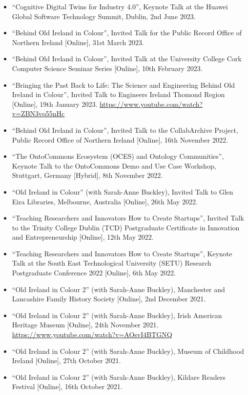 \documentclass[10pt,a4paper]{res} %
\begin{document}
\begin{resume}
\begin{itemize} \itemsep -2pt
\item ``Cognitive Digital Twins for Industry 4.0'', Keynote Talk at the Huawei Global Software Technology Summit, Dublin, 2nd June 2023.
\item ``Behind Old Ireland in Colour'', Invited Talk for the Public Record Office of Northern Ireland [Online], 31st March 2023.
\item ``Behind Old Ireland in Colour'', Invited Talk at the University College Cork Computer Science Seminar Series [Online], 10th February 2023.
\item ``Bringing the Past Back to Life: The Science and Engineering Behind Old Ireland in Colour'', Invited Talk to Engineers Ireland Thomond Region [Online], 19th January 2023. \url{https://www.youtube.com/watch?v=ZBN3vq55nHc}
\item ``Behind Old Ireland in Colour'', Invited Talk to the CollabArchive Project, Public Record Office of Northern Ireland [Online], 16th November 2022.
\item ``The OntoCommons Ecosystem (OCES) and Ontology Communities'', Keynote Talk to the OntoCommons Demo and Use Case Workshop, Stuttgart, Germany [Hybrid], 8th November 2022.
\item ``Old Ireland in Colour'' (with Sarah-Anne Buckley), Invited Talk to Glen Eira Libraries, Melbourne, Australia [Online], 26th May 2022.
\item ``Teaching Researchers and Innovators How to Create Startups'', Invited Talk to the Trinity College Dublin (TCD) Postgraduate Certificate in Innovation and Entrepreneurship [Online], 12th May 2022.
\item ``Teaching Researchers and Innovators How to Create Startups'', Keynote Talk at the South East Technological University (SETU) Research Postgraduate Conference 2022 [Online], 6th May 2022.
\item ``Old Ireland in Colour 2'' (with Sarah-Anne Buckley), Manchester and Lancashire Family History Society [Online], 2nd December 2021.
\item ``Old Ireland in Colour 2'' (with Sarah-Anne Buckley), Irish American Heritage Museum [Online], 24th November 2021. \url{https://www.youtube.com/watch?v=AOsvI4BTGNQ}
\item ``Old Ireland in Colour 2'' (with Sarah-Anne Buckley), Museum of Childhood Ireland [Online], 27th October 2021.
\item ``Old Ireland in Colour 2'' (with Sarah-Anne Buckley), Kildare Readers Festival [Online], 16th October 2021.

\end{itemize}
\end{resume}
\end{document}
